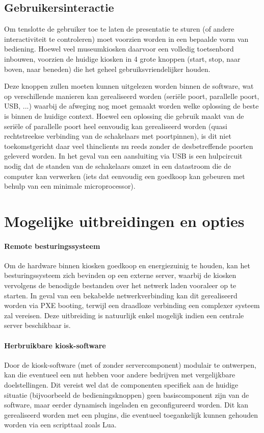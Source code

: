 \documentclass[a4paper,oneside,11pt,final]{memoir}
\begin{document}
\subsection{Gebruikersinteractie}

Om tenslotte de gebruiker toe te laten de presentatie te sturen (of andere interactiviteit te controleren) moet voorzien worden in een bepaalde vorm van bediening. Hoewel veel museumkiosken daarvoor een volledig toetsenbord inbouwen, voorzien de huidige kiosken in 4 grote knoppen (start, stop, naar boven, naar beneden) die het geheel gebruiksvriendelijker houden.

Deze knoppen zullen moeten kunnen uitgelezen worden binnen de software, wat op verschillende manieren kan gerealiseerd worden (seriële poort, parallelle poort, USB, ...) waarbij de afweging nog moet gemaakt worden welke oplossing de beste is binnen de huidige context. Hoewel een oplossing die gebruik maakt van de seriële of parallelle poort heel eenvoudig kan gerealiseerd worden (quasi rechtstreekse verbinding van de schakelaars met poortpinnen), is dit niet toekomstgericht daar veel thinclients nu reeds zonder de desbetreffende poorten geleverd worden. In het geval van een aansluiting via USB is een hulpcircuit nodig dat de standen van de schakelaars omzet in een datastroom die de computer kan verwerken (iets dat eenvoudig een goedkoop kan gebeuren met behulp van een minimale microprocessor).


\section{Mogelijke uitbreidingen en opties}

\paragraph{Remote besturingssysteem} Om de hardware binnen kiosken goedkoop en energiezuinig te houden, kan het besturingssysteem zich bevinden op een externe server, waarbij de kiosken vervolgens de benodigde bestanden over het netwerk laden vooraleer op te starten. In geval van een bekabelde netwerkverbinding kan dit gerealiseerd worden via PXE booting, terwijl een draadloze verbinding een complexer systeem zal vereisen. Deze uitbreiding is natuurlijk enkel mogelijk indien een centrale server beschikbaar is.

\paragraph{Herbruikbare kiosk-software} Door de kiosk-software (met of zonder servercomponent) modulair te ontwerpen, kan die eventueel een nut hebben voor andere bedrijven met vergelijkbare doelstellingen. Dit vereist wel dat de componenten specifiek aan de huidige situatie (bijvoorbeeld de bedieningsknoppen) geen basiscomponent zijn van de software, maar eerder dynamisch ingeladen en geconfigureerd worden. Dit kan gerealiseerd worden met een plugins, die eventueel toegankelijk kunnen gehouden worden via een scripttaal zoals Lua.
\end{document}
